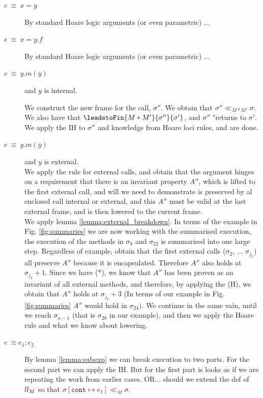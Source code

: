 \begin{description} 
\item[$e\ \equiv\ x=y $] 

By standard Hoare logic arguments (or even parametric) ...
\item[$e\ \equiv\ x=y.f $] 

By standard Hoare logic arguments (or even parametric) ...

 \item[$e\ \equiv\ y.m(\overline y)$]  
and $y$ is internal. 

We construct the new frame for the call, $\sigma''$. We obtain that $\sigma'' \ll_{M*M'} \sigma$. We also have that  $ \leadstoFin  {M*M'}{\sigma''}  {\sigma'}$, and $\sigma''$ "returns to $\sigma'$.
We apply the IH to $\sigma''$ and knowledge from Hoare loci rules, and are done.  

\item[$e\ \equiv\ y.m(\overline y)$]  and $y$ is external. 
\\
We apply the rule for external calls, and obtain that the argument hinges on a requirement that there is an invariant property $A''$, which is lifted to the first external call, and will we need to demonstrate is preserved by al enclosed call internal or external, and this $A''$ must be valid at the last external frame, and is then lowered to the current frame.
\\
We apply lemma \ref{lemma:external_breakdown}. In terms of the example in Fig. \ref{fig:summaries} we are now working with the summarised execution, \ie the execution of the methods in $\sigma_8$ and 
$\sigma_{22}$ is summarised into one large step.
Regardless of example, obtain that the first external calls ($\sigma_2$, ... $\sigma_{j_2}$) all preserve $A''$ because it is encapsulated. 
Therefore $A''$ also holds at $\sigma_{j_2}+1$. 
Since we have (*), we know that $A''$ has been proven as an invariant of all external methods, and therefore, by applying the (H), we obtain that $A''$ holds at $\sigma_{j_2} + 3$  (In terms of our example in Fig. \ref{fig:summaries}  $A''$ would hold in $\sigma_{24}).$ 
We continue in the same vain, until we reach $\sigma_{n-1}$ (that is $\sigma_{28}$ in our example), and then we apply the Hoare rule and what we know about lowering.
 \item[$e\ \equiv e_1; e_2$ ]
 By lemma \ref{lemma:subexp} we can break execution to two parts. For the second part we can apply the IH. But for the first part is looks as if we are repeating the work from earlier cases. OR... should we extend the def of $\\ll_M$ so that $\sigma[\texttt{cont}\mapsto e_1] \ll_M \sigma$.
\end{description}


